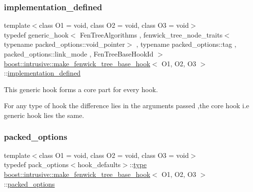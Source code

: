 \subsubsection{\texorpdfstring{implementation\+\_\+defined}{implementation\_defined}}
{\footnotesize\ttfamily template$<$class O1 = void, class O2 = void, class O3 = void$>$ \\
typedef generic\+\_\+hook$<$ Fen\+Tree\+Algorithms , fenwick\+\_\+tree\+\_\+node\+\_\+traits$<$typename packed\+\_\+options\+::void\+\_\+pointer$>$ , typename packed\+\_\+options\+::tag , packed\+\_\+options\+::link\+\_\+mode , Fen\+Tree\+Base\+Hook\+Id $>$ \hyperlink{classboost_1_1intrusive_1_1make__fenwick__tree__base__hook}{boost\+::intrusive\+::make\+\_\+fenwick\+\_\+tree\+\_\+base\+\_\+hook}$<$ O1, O2, O3 $>$\+::\hyperlink{classboost_1_1intrusive_1_1make__fenwick__tree__base__hook_af661b0546c575716fb1fc71c0446929c}{implementation\+\_\+defined}}


\begin{DoxyItemize}
\item This generic hook forms a core part for every hook.  
\item For any type of hook the difference lies in the arguments passed ,the core hook i.\+e generic hook lies the same. 
\end{DoxyItemize}\mbox{\label{classboost_1_1intrusive_1_1make__fenwick__tree__base__hook_af7deddd956f4b6beda854f8c98dcf637}} 
\subsubsection{\texorpdfstring{packed\+\_\+options}{packed\_options}}
{\footnotesize\ttfamily template$<$class O1 = void, class O2 = void, class O3 = void$>$ \\
typedef pack\+\_\+options$<$hook\+\_\+defaults$>$\+::\hyperlink{classboost_1_1intrusive_1_1make__fenwick__tree__base__hook_ac194b5544afb5fb14dca7765784c8eb7}{type} \hyperlink{classboost_1_1intrusive_1_1make__fenwick__tree__base__hook}{boost\+::intrusive\+::make\+\_\+fenwick\+\_\+tree\+\_\+base\+\_\+hook}$<$ O1, O2, O3 $>$\+::\hyperlink{classboost_1_1intrusive_1_1make__fenwick__tree__base__hook_af7deddd956f4b6beda854f8c98dcf637}{packed\+\_\+options}}

